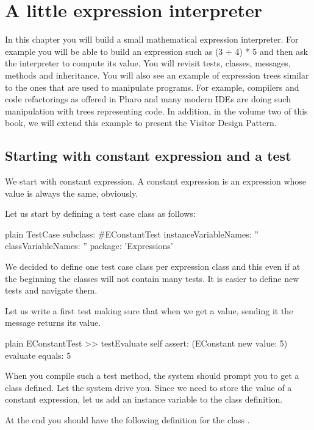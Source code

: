 \documentclass[10pt,twoside,english]{_support/latex/sbabook/sbabook}
\begin{document}
\chapter{A little expression interpreter}\label{cha:expressions}
In this chapter you will build a small mathematical expression interpreter. For example you will be able to build an expression such as  (3 + 4) * 5 and then ask the interpreter to compute its value. You will revisit tests, classes, messages, methods and inheritance. 
You will also see an example of expression trees similar to the ones that are used to manipulate programs. For example, compilers and code refactorings as offered in Pharo and many modern IDEs are doing such manipulation with trees representing code. 
In addition, in the volume two of this book, we will extend this example to present the Visitor Design Pattern. 
\section{Starting with constant expression and a test}
We start with constant expression. A constant expression is an expression whose value is always the same, obviously.

Let us start by defining a test case class as follows: 

\begin{displaycode}{plain}
TestCase subclass: #EConstantTest
	instanceVariableNames: ''
	classVariableNames: ''
	package: 'Expressions'
\end{displaycode}

 We decided to define one test case class per expression class and this even if at the beginning the classes will not contain many tests. It is easier to define new tests and navigate them.
 
Let us write a first test making sure that when we get a value, sending it the  message returns its value. 

\begin{displaycode}{plain}
EConstantTest >> testEvaluate 
	self assert: (EConstant new value: 5) evaluate equals: 5
\end{displaycode}

When you compile such a test method, the system should prompt you to get a class  defined. 
Let the system drive you. Since we need to store the value of a constant expression, let us add an instance variable 
to the class definition. 

At the end you should have the following definition for the class .
\end{document}
